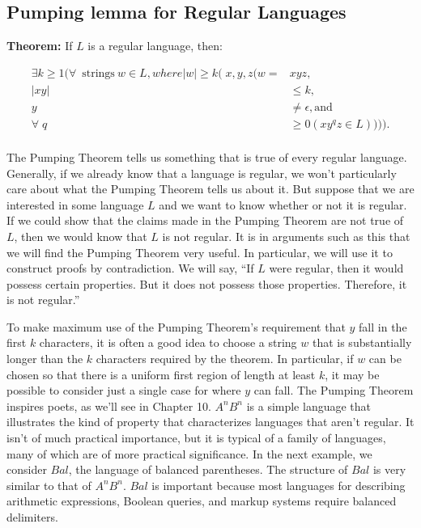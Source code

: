 \documentclass{article}
\begin{document}
\subsection{Pumping lemma for Regular Languages }

\textbf{Theorem:} If $L$ is a regular language, then: 

\begin{align*}
		\exists k \ge 1 ( \forall \>\text{strings} \> w \in L, where |w| \ge k (x, y, z (w = &xyz, \\
		 |xy| &\le k, \\
		 y &\ne \epsilon, \text{and} \\
		\forallq &\ge 0 (xy^{q}z \in L)))). \\
\end{align*}
 
The Pumping Theorem tells us something that is true of every regular language.
Generally, if we already know that a language is regular, we won’t particularly
care about what the Pumping Theorem tells us about it. But suppose that we are
interested in some language $L$ and we want to know whether or not it is
regular. If we could show that the claims made in the Pumping Theorem are not
true of $L$, then we would know that $L$ is not regular. It is in arguments
such as this that we will find the Pumping Theorem very useful. In particular,
we will use it to construct proofs by contradiction. We will say, “If $L$ were
regular, then it would possess certain properties. But it does not possess
those properties. Therefore, it is not regular.”

To make maximum use of the Pumping Theorem’s requirement that $y$ fall in the
first $k$ characters, it is often a good idea to choose a string $w$ that is
substantially longer than the $k$ characters required by the theorem. In
particular, if $w$ can be chosen so that there is a uniform first region of
length at least $k$, it may be possible to consider just a single case for
where $y$ can fall. The Pumping Theorem inspires poets, as we’ll see in Chapter
10. $A^nB^n$ is a simple language that illustrates the kind of property that
characterizes languages that aren’t regular. It isn’t of much practical
importance, but it is typical of a family of languages, many of which are of
more practical significance. In the next example, we consider $Bal$, the
language of balanced parentheses. The structure of $Bal$ is very similar to
that of $A^nB^n$. $Bal$ is important because most languages for describing
arithmetic expressions, Boolean queries, and markup systems require balanced
delimiters.
\end{document}
